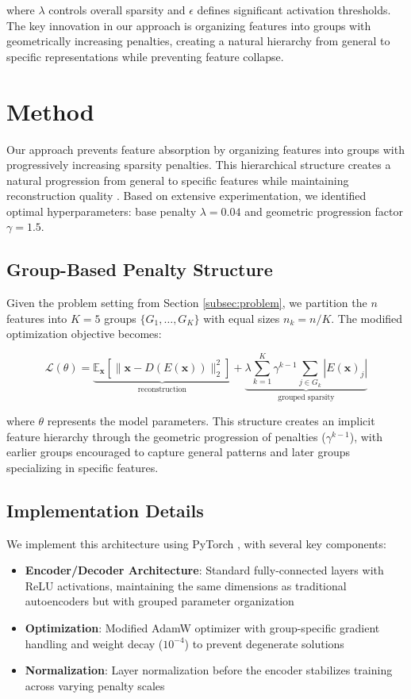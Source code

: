 \documentclass{article} %
\begin{document}
where $\lambda$ controls overall sparsity and $\epsilon$ defines significant activation thresholds. The key innovation in our approach is organizing features into groups with geometrically increasing penalties, creating a natural hierarchy from general to specific representations while preventing feature collapse.

\section{Method}
\label{sec:method}

Our approach prevents feature absorption by organizing features into groups with progressively increasing sparsity penalties. This hierarchical structure creates a natural progression from general to specific features while maintaining reconstruction quality \cite{goodfellow2016deep}. Based on extensive experimentation, we identified optimal hyperparameters: base penalty $\lambda=0.04$ and geometric progression factor $\gamma=1.5$.

\subsection{Group-Based Penalty Structure}
Given the problem setting from Section \ref{subsec:problem}, we partition the $n$ features into $K=5$ groups $\{G_1,\ldots,G_K\}$ with equal sizes $n_k=n/K$. The modified optimization objective becomes:

\begin{equation}
    \mathcal{L}(\theta) = \underbrace{\mathbb{E}_{\mathbf{x}}[\|\mathbf{x} - D(E(\mathbf{x}))\|_2^2]}_{\text{reconstruction}} + \underbrace{\lambda\sum_{k=1}^K \gamma^{k-1}\sum_{j \in G_k} |E(\mathbf{x})_j|}_{\text{grouped sparsity}}
\end{equation}

where $\theta$ represents the model parameters. This structure creates an implicit feature hierarchy through the geometric progression of penalties ($\gamma^{k-1}$), with earlier groups encouraged to capture general patterns and later groups specializing in specific features.

\subsection{Implementation Details}
We implement this architecture using PyTorch \cite{paszke2019pytorch}, with several key components:

\begin{itemize}
    \item \textbf{Encoder/Decoder Architecture}: Standard fully-connected layers with ReLU activations, maintaining the same dimensions as traditional autoencoders but with grouped parameter organization
    \item \textbf{Optimization}: Modified AdamW optimizer \cite{loshchilov2017adamw} with group-specific gradient handling and weight decay ($10^{-4}$) to prevent degenerate solutions
    \item \textbf{Normalization}: Layer normalization \cite{ba2016layer} before the encoder stabilizes training across varying penalty scales
\end{itemize}
\end{document}
